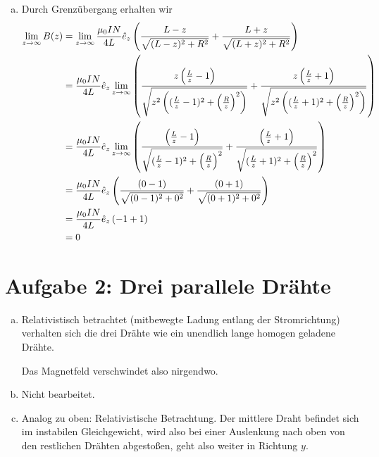 \documentclass[a4paper,german,12pt,smallheadings]{scrartcl}
\begin{document}
\begin{enumerate}[a)]
\item Durch Grenzübergang erhalten wir
\begin{align*}
  \lim\limits_{z \to \infty} B(z)
  &=
  \lim\limits_{z \to \infty}
  \frac{\mu_0 I N}{4L} \hat{e}_z
  \del{
    \frac{L-z}{\sqrt{(L-z)^2 + R^2}}
    +\frac{L+z}{\sqrt{(L+z)^2 + R^2}}
  } \\
  &=
  \frac{\mu_0 I N}{4L} \hat{e}_z
  \lim\limits_{z \to \infty}
  \del{
    \frac{z\del{\frac{L}{z}-1}}{\sqrt{z^2 \del{(\frac{L}{z}-1)^2 + \del{\frac{R}{z}}^2}}}
    +
    \frac{z\del{\frac{L}{z}+1}}{\sqrt{z^2 \del{(\frac{L}{z}+1)^2 + \del{\frac{R}{z}}^2}}}
  } \\
  &=
  \frac{\mu_0 I N}{4L} \hat{e}_z
  \lim\limits_{z \to \infty}
  \del{
    \frac{\del{\frac{L}{z}-1}}{\sqrt{(\frac{L}{z}-1)^2 + \del{\frac{R}{z}}^2}}
    +
    \frac{\del{\frac{L}{z}+1}}{\sqrt{(\frac{L}{z}+1)^2 + \del{\frac{R}{z}}^2}}
  } \\
  &=
  \frac{\mu_0 I N}{4L} \hat{e}_z
  \del{
    \frac{\del{0-1}}{\sqrt{(0-1)^2 + 0^2}}
    +
    \frac{\del{0+1}}{\sqrt{(0+1)^2 + 0^2}}
  } \\
  &=
  \frac{\mu_0 I N}{4L} \hat{e}_z
  \del{
    -1 + 1
  } \\
  &= 0
\end{align*}
\end{enumerate}

\section*{Aufgabe 2: Drei parallele Drähte}
\begin{enumerate}[a)]
  \item
    Relativistisch betrachtet (mitbewegte Ladung entlang der Stromrichtung)
    verhalten sich die drei Drähte wie ein unendlich lange homogen geladene
    Drähte.

    Das Magnetfeld verschwindet also nirgendwo.
  \item Nicht bearbeitet. %
  \item
    Analog zu oben: Relativistische Betrachtung. Der mittlere Draht befindet
    sich im instabilen Gleichgewicht, wird also bei einer Auslenkung nach oben
    von den restlichen Drähten abgestoßen, geht also weiter in Richtung $y$.
\end{enumerate}
\end{document}

